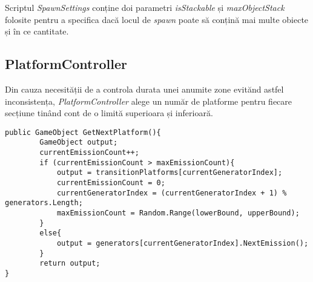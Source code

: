 Scriptul \textit{SpawnSettings} conține doi parametri \textit{isStackable} și \textit{maxObjectStack} folosite pentru a specifica dacă locul de \textit{spawn} poate să conțină mai multe obiecte și în ce cantitate.\par

\subsection{PlatformController}

Din cauza necesității de a controla durata unei anumite zone evitănd astfel inconsistența, \textit{PlatformController} alege un număr de platforme pentru fiecare secțiune tinând cont de o limită superioara și inferioară.\par

\begin{lstlisting}[caption=Funcțiile din PlatformController,
  label=a_label,
  mathescape=false]
public GameObject GetNextPlatform(){
        GameObject output;
        currentEmissionCount++;
        if (currentEmissionCount > maxEmissionCount){
            output = transitionPlatforms[currentGeneratorIndex];
            currentEmissionCount = 0;
            currentGeneratorIndex = (currentGeneratorIndex + 1) % generators.Length;
            maxEmissionCount = Random.Range(lowerBound, upperBound);
        }
        else{
            output = generators[currentGeneratorIndex].NextEmission();
        }
        return output;
}
\end{lstlisting}
